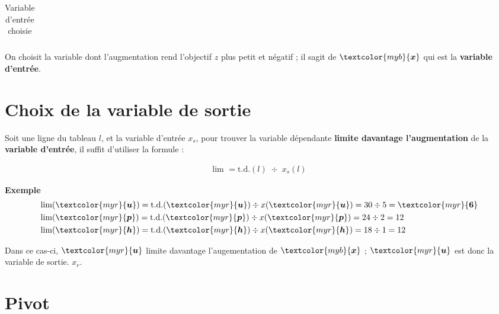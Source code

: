 \documentclass{report}
\begin{document}
\begin{multicols*}{2}
\begin{table}[H]
\begin{center}
\begin{tabular}{|l|l l l l l |l|l|}
                        \end{tabular}
                \end{center}
        \caption{Variable d'entrée choisie}
        \end{table}         
 On choisit la variable dont l'augmentation rend l'objectif $z$ 
plus petit et négatif ; il sagit de $\textcolor{myb}{\boldsymbol{x}}$ qui 
est la \textcolor{myb}{\textbf{variable d'entrée}}.


\section{Choix de la variable de sortie}
Soit une ligne du tableau $l$, et la variable d'entrée 
$x_s$, pour trouver la variable dépendante 
\textbf{limite davantage l'augmentation} de la 
\textcolor{myb}{\textbf{variable d'entrée}}, il suffit d'utiliser la formule  : 


\begin{align*}
    \boxed{\text{lim } = \text{t.d.}(l) \; \div \; x_s(l)}
\end{align*}


\noindent
\textbf{Exemple} 
\begin{align*}
    &\text{lim}(\textcolor{myr}{\boldsymbol{u}} ) = 
    \text{t.d.}(\textcolor{myr}{\boldsymbol{u}}) \div 
    x(\textcolor{myr}{\boldsymbol{u}}) = 30 \div 5 = \textcolor{myr}{\boldsymbol{6}}
    \\
    &\text{lim}(\textcolor{myr}{\boldsymbol{p}} ) = 
\text{t.d.}(\textcolor{myr}{\boldsymbol{p}}) \div 
    x(\textcolor{myr}{\boldsymbol{p}}) = 24 \div 2 = 12 
    \\
    &\text{lim}(\textcolor{myr}{\boldsymbol{h}}) = 
\text{t.d.}(\textcolor{myr}{\boldsymbol{h}}) \div 
    x(\textcolor{myr}{\boldsymbol{h}}) = 18 \div 1 = 12 
\end{align*}

Dans ce cas-ci, $\textcolor{myr}{\boldsymbol{u}}$ limite davantage l'augementation de 
$\textcolor{myb}{\boldsymbol{x}}$ ; $\textcolor{myr}{\boldsymbol{u}}$ est donc la variable de sortie.
$x_r$.

\section{Pivot}


\end{multicols*}
\end{document}
